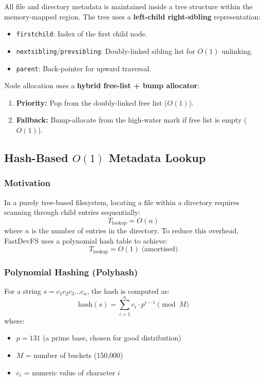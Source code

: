 \documentclass[12pt, a4paper]{article}
\begin{document}
All file and directory metadata is maintained inside a tree structure within the memory-mapped region. The tree uses a \textbf{left-child right-sibling} representation:

\begin{itemize}
  \item \texttt{firstchild}: Index of the first child node.
  \item \texttt{nextsibling}/\texttt{prevsibling}: Doubly-linked sibling list for $O(1)$ unlinking.
  \item \texttt{parent}: Back-pointer for upward traversal.
\end{itemize}

Node allocation uses a \textbf{hybrid free-list + bump allocator}:
\begin{enumerate}
  \item \textbf{Priority:} Pop from the doubly-linked free list ($O(1)$).
  \item \textbf{Fallback:} Bump-allocate from the high-water mark if free list is empty ($O(1)$).
\end{enumerate}

\subsection{Hash-Based $O(1)$ Metadata Lookup}

\subsubsection{Motivation}

In a purely tree-based filesystem, locating a file within a directory requires scanning through child entries sequentially:
$$T_{\text{lookup}} = O(n)$$
where $n$ is the number of entries in the directory. To reduce this overhead, FastDevFS uses a polynomial hash table to achieve:
$$T_{\text{lookup}} = O(1) \; \text{(amortised)}$$

\subsubsection{Polynomial Hashing (Polyhash)}

For a string $s = c_1 c_2 c_3 \ldots c_n$, the hash is computed as:
$$\text{hash}(s) = \sum_{i=1}^{n} c_i \cdot p^{i-1} \pmod{M}$$
where:
\begin{itemize}
  \item $p = 131$ (a prime base, chosen for good distribution)
  \item $M$ = number of buckets (150,000)
  \item $c_i$ = numeric value of character $i$
\end{itemize}
\end{document}
